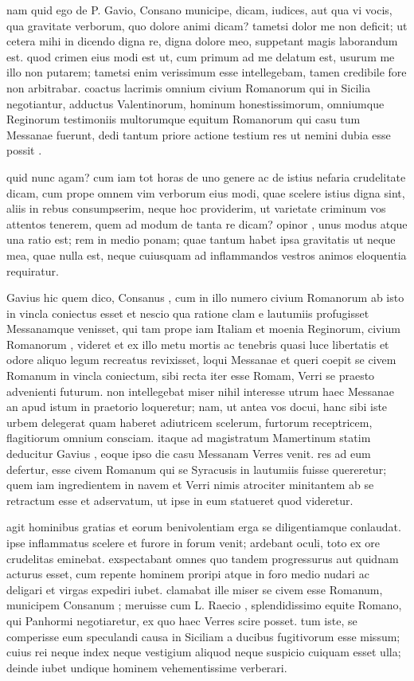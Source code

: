  nam quid ego de P. Gavio, Consano municipe, dicam, iudices, aut qua vi vocis, qua gravitate verborum, quo dolore animi dicam? tametsi dolor me non deficit; ut cetera mihi in dicendo digna re, digna dolore meo, suppetant magis laborandum est. quod crimen eius modi est ut, cum primum ad me delatum est, usurum me illo non putarem; tametsi enim verissimum esse intellegebam, tamen credibile fore non arbitrabar. coactus lacrimis omnium civium Romanorum qui in Sicilia negotiantur, adductus Valentinorum, hominum honestissimorum, omniumque Reginorum testimoniis multorumque equitum Romanorum qui casu tum Messanae fuerunt, dedi tantum priore actione testium res ut nemini dubia esse possit .

 quid nunc agam? cum iam tot horas de uno genere ac de istius nefaria crudelitate dicam, cum prope omnem vim verborum eius modi, quae scelere istius digna sint, aliis in rebus consumpserim, neque hoc providerim, ut varietate criminum vos attentos tenerem, quem ad modum de tanta re dicam? opinor , unus modus atque una ratio est; rem in medio ponam; quae tantum habet ipsa gravitatis ut neque mea, quae nulla est, neque cuiusquam ad inflammandos vestros animos eloquentia requiratur.

 Gavius hic quem dico, Consanus , cum in illo numero civium Romanorum ab isto in vincla coniectus esset et nescio qua ratione clam e lautumiis profugisset Messanamque venisset, qui tam prope iam Italiam et moenia Reginorum, civium Romanorum , videret et ex illo metu mortis ac tenebris quasi luce libertatis et odore aliquo legum recreatus revixisset, loqui Messanae et queri coepit se civem Romanum in vincla coniectum, sibi recta iter esse Romam, Verri se praesto advenienti futurum. non intellegebat miser nihil interesse utrum haec Messanae an apud istum in praetorio loqueretur; nam, ut antea vos docui, hanc sibi iste urbem delegerat quam haberet adiutricem scelerum, furtorum receptricem, flagitiorum omnium consciam. itaque ad magistratum Mamertinum statim deducitur Gavius , eoque ipso die casu Messanam Verres venit. res ad eum defertur, esse civem Romanum qui se Syracusis in lautumiis fuisse quereretur; quem iam ingredientem in navem et Verri nimis atrociter minitantem ab se retractum esse et adservatum, ut ipse in eum statueret quod videretur.

 agit hominibus gratias et eorum benivolentiam erga se diligentiamque conlaudat. ipse inflammatus scelere et furore in forum venit; ardebant oculi, toto ex ore crudelitas eminebat. exspectabant omnes quo tandem progressurus aut quidnam acturus esset, cum repente hominem proripi atque in foro medio nudari ac deligari et virgas expediri iubet. clamabat ille miser se civem esse Romanum, municipem Consanum ; meruisse cum L. Raecio , splendidissimo equite Romano, qui Panhormi negotiaretur, ex quo haec Verres scire posset. tum iste, se comperisse eum speculandi causa in Siciliam a ducibus fugitivorum esse missum; cuius rei neque index neque vestigium aliquod neque suspicio cuiquam esset ulla; deinde iubet undique hominem vehementissime verberari.

